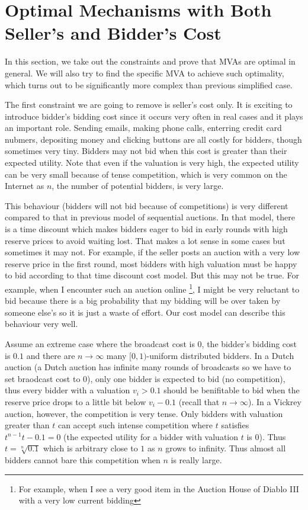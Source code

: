 \section{Optimal Mechanisms with Both Seller's and Bidder's Cost}

In this section, we take out the constraints and prove that MVAs are optimal in
general. We will also try to find the specific MVA to achieve such optimality,
which turns out to be significantly more complex than previous
simplified case.

The first constraint we are going to remove is seller's cost only.  It is
exciting to introduce bidder's bidding cost since it occurs very often in real
cases and it plays an important role.  Sending emails, making phone calls,
enterring credit card nubmers, depositing money and clicking buttons are all
costly for bidders, though sometimes very tiny.  Bidders may not bid when this
cost is greater than their expected utility. Note that even if the valuation is
very high, the expected utility can be very small because of tense competition,
which is very common on the Internet as $n$, the number of potential bidders,
is very large. 

This behaviour (bidders will not bid because of competitions) is very different
compared to that in previous model \cite{McAfee97:SequentialAuctions} of
sequential auctions. In that model, there is a time discount which
makes bidders eager to bid in early rounds with high reserve prices to avoid
waiting lost. That makes a lot sense in some cases but sometimes it may not.
For example, if the seller posts an auction with a very low reserve price in
the first round, most bidders with high valuation must be happy to bid
according to that time discount cost model. But this may not be true. For
example, when I encounter such an auction online \footnote{For example, when I
see a very good item in the Auction House of Diablo III with a very low current
bidding}, I might be very reluctant to bid because there is a big probability
that my bidding will be over taken by someone else's so it is just a waste of
effort. Our cost model can describe this behaviour very well.

Assume an extreme case where the broadcast cost is $0$, the bidder's bidding
cost is $0.1$ and there are $n \rightarrow \infty$ many $[0, 1)$-uniform
distributed bidders. In a Dutch auction (a Dutch auction has infinite many
rounds of broadcasts so we have to set braodcast cost to $0$), only one bidder
is expected to bid (no competition), thus every bidder with a valuation $v_i
> 0.1$ should be benifitable to bid when the reserve price drops to a little
bit below $v_i-0.1$ (recall that $n \rightarrow \infty$).  In a Vickrey
auction, however, the competition is very tense. Only bidders with valuation
greater than $t$ can accept such intense competition where $t$ satisfies
$t^{n-1}t - 0.1 = 0$ (the expected utility for a bidder with valuation $t$ is
$0$).  Thus $t = \sqrt[n]{0.1}$ which is arbitrary close to $1$ as $n$ grows to
infinity.  Thus almost all bidders cannot bare this competition when $n$ is
really large.

